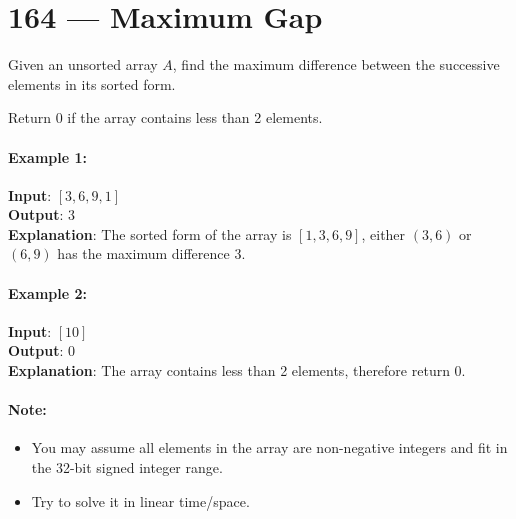 \section{164 --- Maximum Gap}
Given an unsorted array $A$, find the maximum difference between the successive elements in its sorted form.
\par
Return 0 if the array contains less than 2 elements.
\paragraph{Example 1:}
\begin{flushleft}
\textbf{Input}: $[3,6,9,1]$
\\
\textbf{Output}: 3
\\
\textbf{Explanation}: The sorted form of the array is $[1,3,6,9]$, either $(3,6)$ or $(6,9)$ has the maximum difference 3.
\end{flushleft}
\paragraph{Example 2:}
\begin{flushleft}
\textbf{Input}: $[10]$
\\
\textbf{Output}: 0
\\
\textbf{Explanation}: The array contains less than 2 elements, therefore return 0.
\end{flushleft}
\paragraph{Note:}
\begin{itemize}
    \item You may assume all elements in the array are non-negative integers and fit in the 32-bit signed integer range.
    \item Try to solve it in linear time/space.
\end{itemize}

